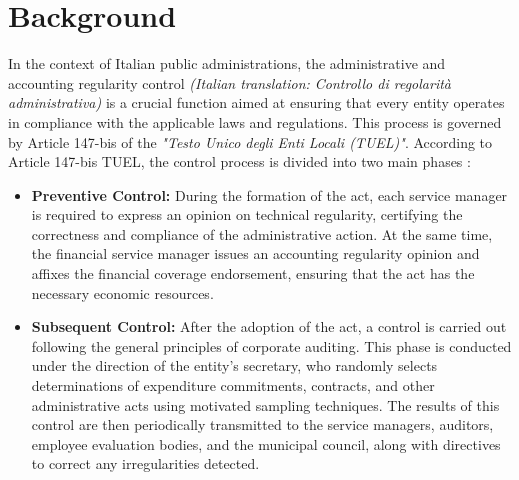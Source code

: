 \documentclass[../main.tex]{subfiles}
\begin{document}

\section{Background}
In the context of Italian public administrations, the administrative and accounting regularity control \textit{(Italian translation: Controllo di regolarità administrativa)} is a crucial function aimed at ensuring that every entity operates in compliance with the applicable laws and regulations. This process is governed by Article 147-bis of the \textit{"Testo Unico degli Enti Locali (TUEL)"}. According to Article 147-bis TUEL, the control process is divided into two main phases \cite{tuel_art147bis}:

\begin{itemize}
    \item \textbf{Preventive Control:} During the formation of the act, each service manager is required to express an opinion on technical regularity, certifying the correctness and compliance of the administrative action. At the same time, the financial service manager issues an accounting regularity opinion and affixes the financial coverage endorsement, ensuring that the act has the necessary economic resources.
    \item \textbf{Subsequent Control:} After the adoption of the act, a control is carried out following the general principles of corporate auditing. This phase is conducted under the direction of the entity's secretary, who randomly selects determinations of expenditure commitments, contracts, and other administrative acts using motivated sampling techniques. The results of this control are then periodically transmitted to the service managers, auditors, employee evaluation bodies, and the municipal council, along with directives to correct any irregularities detected.
\end{itemize}
\end{document}
